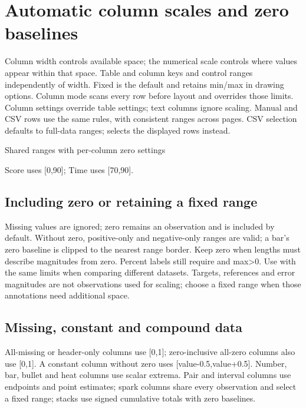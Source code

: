 \section{Automatic column scales and zero baselines}
\label{sec:column-scale}
Column width controls available space; the numerical scale controls where values
appear within that space. Table and column keys  and
 control ranges independently of width.
Fixed is the default and retains min/max in drawing options. Column mode scans
every row before layout and overrides those limits. Column settings override
table settings; text columns ignore scaling. Manual and CSV rows use the same
rules, with consistent ranges across pages. CSV selection defaults to full-data
ranges;  selects the displayed rows instead.
\begin{demo}{Shared ranges with per-column zero settings}
\begin{center}
\begin{gradtable}[align=c,header align=c,width=\linewidth,scale=column,include zero=false]
\end{gradtable}
\end{center}
\end{demo}
Score uses [0,90]; Time uses [70,90].
\subsection{Including zero or retaining a fixed range}
Missing values are ignored; zero remains an observation and is included by
default. Without zero, positive-only and negative-only ranges are valid; a bar's
zero baseline is clipped to the nearest range border. Keep zero when lengths
must describe magnitudes from zero. Percent labels still require  and max>0.
Use  with the same limits when comparing different datasets. Targets,
references and error magnitudes are not observations used for scaling; choose a
fixed range when those annotations need additional space.
\subsection{Missing, constant and compound data}
All-missing or header-only columns use [0,1]; zero-inclusive all-zero columns
also use [0,1]. A constant column without zero uses [value-0.5,value+0.5].
Number, bar, bullet and heat columns use scalar extrema. Pair and interval
columns use endpoints and point estimates; spark columns share every observation
and select a fixed range; stacks use signed cumulative totals with zero baselines.

